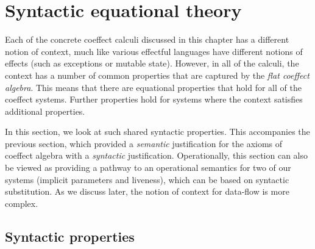 %                                                                   
%

\section{Syntactic equational theory}
\label{sec:flat-syntax}

Each of the concrete coeffect calculi discussed in this chapter has a different notion of context,
much like various effectful languages have different notions of effects (such as exceptions or
mutable state). However, in all of the calculi, the context has a number of common properties that 
are captured by the \emph{flat coeffect algebra}. This means that there are equational properties
that hold for all of the coeffect systems. Further properties hold for systems where the context
satisfies additional properties. 

In this section, we look at such shared syntactic properties. This accompanies the previous section, 
which provided a \emph{semantic} justification for the axioms of coeffect algebra with a 
\emph{syntactic} justification. Operationally, this section can also be viewed as providing a 
pathway to an operational semantics for two of our systems (implicit parameters and liveness),
which can be based on syntactic substitution. As we discuss later, the notion of context for
data-flow is more complex.


\subsection{Syntactic properties}
\label{sec:flat-syntax-props}

